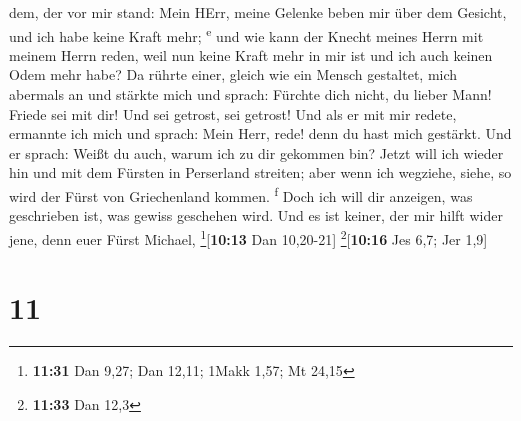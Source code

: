 dem, der vor mir stand: Mein HErr, meine Gelenke beben mir über dem
Gesicht, und ich habe keine Kraft mehr; \textsuperscript{e}
 und wie kann der Knecht meines Herrn mit meinem Herrn
reden, weil nun keine Kraft mehr in mir ist und ich auch keinen Odem
mehr habe?  Da rührte einer, gleich wie ein Mensch
gestaltet, mich abermals an und stärkte mich  und sprach:
Fürchte dich nicht, du lieber Mann! Friede sei mit dir! Und sei getrost,
sei getrost! Und als er mit mir redete, ermannte ich mich und sprach:
Mein Herr, rede! denn du hast mich gestärkt.  Und er
sprach: Weißt du auch, warum ich zu dir gekommen bin? Jetzt will ich
wieder hin und mit dem Fürsten in Perserland streiten; aber wenn ich
wegziehe, siehe, so wird der Fürst von Griechenland kommen.
\textsuperscript{f}  Doch ich will dir anzeigen, was
geschrieben ist, was gewiss geschehen wird. Und es ist keiner, der mir
hilft wider jene, denn euer Fürst Michael, \footnote{\textbf{11:31} Dan
  9,27; Dan 12,11; 1Makk 1,57; Mt 24,15}{[}\textbf{10:13} Dan
10,20-21{]} \footnote{\textbf{11:33} Dan 12,3}{[}\textbf{10:16} Jes 6,7;
Jer 1,9{]}

\hypertarget{section-10}{%
\section{11}\label{section-10}}

